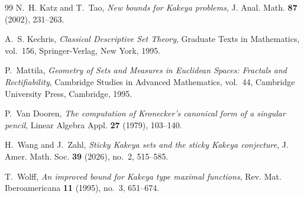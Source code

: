 \documentclass[10pt]{article}
\begin{document}
\begin{thebibliography}{99}
N.~H. Katz and T.~Tao,
\emph{New bounds for Kakeya problems},
J. Anal. Math. \textbf{87} (2002), 231--263.

A.~S. Kechris,
\emph{Classical Descriptive Set Theory},
Graduate Texts in Mathematics, vol.~156,
Springer-Verlag, New York, 1995.

P.~Mattila,
\emph{Geometry of Sets and Measures in Euclidean Spaces: Fractals and Rectifiability},
Cambridge Studies in Advanced Mathematics, vol.~44,
Cambridge University Press, Cambridge, 1995.

P.~Van Dooren,
\emph{The computation of Kronecker's canonical form of a singular pencil},
Linear Algebra Appl. \textbf{27} (1979), 103--140.

H.~Wang and J.~Zahl,
\emph{Sticky Kakeya sets and the sticky Kakeya conjecture},
J. Amer. Math. Soc. \textbf{39} (2026), no.~2, 515--585.

T.~Wolff,
\emph{An improved bound for Kakeya type maximal functions},
Rev. Mat. Iberoamericana \textbf{11} (1995), no.~3, 651--674.

\end{thebibliography}
\end{document}

